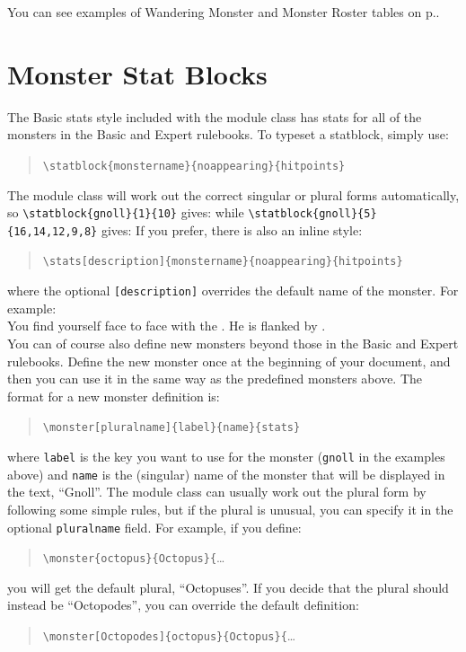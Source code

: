 \documentclass[a4paper,serif]{module}
\begin{document}
You can see examples of Wandering Monster and Monster Roster tables on p.\pageref{wanderingmonsters}.

\section{Monster Stat Blocks}
\label{stat_blocks}

The Basic stats style included with the module class has stats for all of the monsters in the Basic and Expert rulebooks.
To typeset a statblock, simply use:
\begin{quote}
\verb|\statblock{monstername}{noappearing}{hitpoints}|
\end{quote}
The module class will work out the correct singular or plural forms automatically, so
\verb|\statblock{gnoll}{1}{10}| gives:
while \verb|\statblock{gnoll}{5}{16,14,12,9,8}| gives:
If you prefer, there is also an inline style:
\begin{quote}
\hspace{-2em}\verb|\stats[description]{monstername}{noappearing}{hitpoints}|
\end{quote}
where the optional \verb|[description]| overrides the default name of the monster.
For example:\\[0.1em]

\noindent You find yourself face to face with the . He is flanked
by .\\[0.1em]

\noindent You can of course also define new monsters beyond those in the Basic and Expert rulebooks. Define the new
monster once at the beginning of your document, and then you can use it in the same way as the predefined
monsters above. The format for a new monster definition is:
\begin{quote}
\verb|\monster[pluralname]{label}{name}{stats}|
\end{quote}
where \verb|label| is the key you want to use for the monster (\verb|gnoll| in the examples above) and
\verb|name| is the (singular) name of the monster that will be displayed in the text, ``Gnoll''. The module
class can usually work out the plural form by following some simple rules, but if the plural is unusual,
you can specify it in the optional \verb|pluralname| field. For example, if you define:
\begin{quote}
\verb|\monster{octopus}{Octopus}{|\ldots
\end{quote}
you will get the default plural, ``Octopuses''. If you decide that the plural should instead be ``Octopodes'', you can override the default definition:
\begin{quote}
\verb|\monster[Octopodes]{octopus}{Octopus}{|\ldots
\end{quote}
\end{document}
